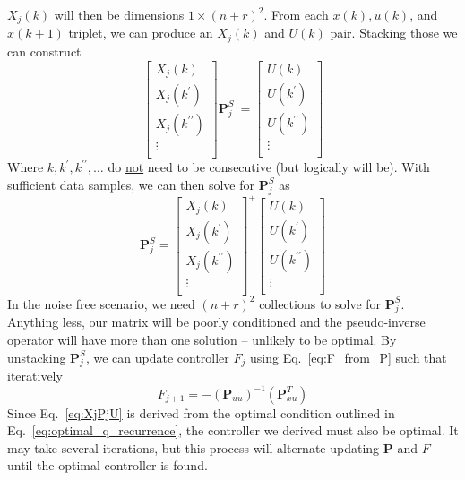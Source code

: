 $X_j\left(k\right)$ will then be dimensions $1\times {\left(n+r\right)}^2$. From each $x\left(k\right),u\left(k\right)$, and $x\left(k+1\right)$ triplet, we can produce an $ X_j\left(k\right)$ and $U(k)$ pair. Stacking those we can construct
\begin{equation}
    {\left[\begin{matrix}{X}_{j}\left({k}\right)\\{X}_{j}\left({k}^\prime\right)\\{X}_{j}\left({k}^{\prime\prime}\right)\\\vdots\\\end{matrix}\right]\textbf{P}_j^S}\ =\left[\begin{matrix}U\left(k\right)\\U\left(k^\prime\right)\\U\left(k^{\prime\prime}\right)\\\vdots\\\end{matrix}\right]
    \label{eq:stacked_Xj_jU}
\end{equation}
Where $k, k^\prime,k^{\prime\prime},\ldots$ do \underline{not} need to be consecutive (but logically will be). With sufficient data samples, we can then solve for $\textbf{P}_j^S$ as
\begin{equation}
    \textbf{P}_j^S={\left[\begin{matrix}{X}_{j}\left({k}\right)\\{X}_{j}\left({k}^\prime\right)\\{X}_{j}\left({k}^{\prime\prime}\right)\\\vdots\\\end{matrix}\right]}^+\left[\begin{matrix}U\left(k\right)\\U\left(k^\prime\right)\\U\left(k^{\prime\prime}\right)\\\vdots\\\end{matrix}\right]
    \label{eq:PjXjU}
\end{equation}
In the noise free scenario, we need ${\left(n+r\right)}^2$ collections to solve for $\textbf{P}_j^S$. Anything less, our matrix will be poorly conditioned and the pseudo-inverse operator will have more than one solution -- unlikely to be optimal. By unstacking $\textbf{P}_j^S$, we can update controller $F_j$ using Eq.~\ref{eq:F_from_P} such that iteratively
\begin{equation}
    F_{j+1}=-{\left(\textbf{P}_{uu}\right)}^{-1}\left(\textbf{P}_{xu}^T\right)
    \label{eq:F_from_P_iterative}
\end{equation}
Since Eq.~\ref{eq:XjPjU} is derived from the optimal condition outlined in Eq.~\ref{eq:optimal_q_recurrence}, the controller we derived must also be optimal. It may take several iterations, but this process will alternate updating \textbf{P} and $F$ until the optimal controller is found.

